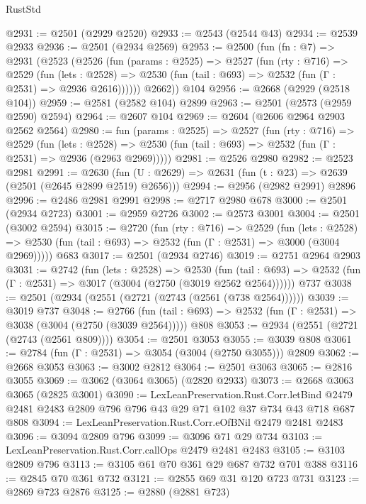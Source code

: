 \begin{lexlean}{RustStd}
\begin{coremodule}
@2931 := @2501 (@2929 @2520)
@2933 := @2543 (@2544 @43)
@2934 := @2539 @2933
@2936 := @2501 (@2934 @2569)
@2953 := @2500
    (fun (fn : @7) =>
    @2931
      (@2523
        (@2526
          (fun (params : @2525) =>
          @2527
            (fun (rty : @716) =>
            @2529
              (fun (lets : @2528) =>
              @2530 (fun (tail : @693) => @2532 (fun (Γ : @2531) => @2936 @2616))))))
        @2662))
    @104
@2956 := @2668 (@2929 (@2518 @104))
@2959 := @2581 (@2582 @104) @2899
@2963 := @2501 (@2573 (@2959 @2590) @2594)
@2964 := @2607 @104
@2969 := @2604 (@2606 @2964 @2903 @2562 @2564)
@2980 := fun (params : @2525) =>
  @2527
    (fun (rty : @716) =>
    @2529
      (fun (lets : @2528) =>
      @2530 (fun (tail : @693) => @2532 (fun (Γ : @2531) => @2936 (@2963 @2969)))))
@2981 := @2526 @2980
@2982 := @2523 @2981
@2991 := @2630 (fun (U : @2629) => @2631 (fun (t : @23) => @2639 (@2501 (@2645 @2899 @2519) @2656)))
@2994 := @2956 (@2982 @2991) @2896
@2996 := @2486 @2981 @2991
@2998 := @2717 @2980 @678
@3000 := @2501 (@2934 @2723)
@3001 := @2959 @2726
@3002 := @2573 @3001
@3004 := @2501 (@3002 @2594)
@3015 := @2720
    (fun (rty : @716) =>
    @2529
      (fun (lets : @2528) =>
      @2530 (fun (tail : @693) => @2532 (fun (Γ : @2531) => @3000 (@3004 @2969)))))
    @683
@3017 := @2501 (@2934 @2746)
@3019 := @2751 @2964 @2903
@3031 := @2742
    (fun (lets : @2528) =>
    @2530
      (fun (tail : @693) => @2532 (fun (Γ : @2531) => @3017 (@3004 (@2750 (@3019 @2562 @2564))))))
    @737
@3038 := @2501 (@2934 (@2551 (@2721 (@2743 (@2561 (@738 @2564))))))
@3039 := @3019 @737
@3048 := @2766
    (fun (tail : @693) => @2532 (fun (Γ : @2531) => @3038 (@3004 (@2750 (@3039 @2564)))))
    @808
@3053 := @2934 (@2551 (@2721 (@2743 (@2561 @809))))
@3054 := @2501 @3053
@3055 := @3039 @808
@3061 := @2784 (fun (Γ : @2531) => @3054 (@3004 (@2750 @3055))) @2809
@3062 := @2668 @3053
@3063 := @3002 @2812
@3064 := @2501 @3063
@3065 := @2816 @3055
@3069 := @3062 (@3064 @3065) (@2820 @2933)
@3073 := @2668 @3063 @3065 (@2825 @3001)
@3090 := LexLeanPreservation.Rust.Corr.letBind
    @2479
    @2481
    @2483
    @2809
    @796
    @796
    @43
    @29
    @71
    @102
    @37
    @734
    @43
    @718
    @687
    @808
@3094 := LexLeanPreservation.Rust.Corr.eOfBNil @2479 @2481 @2483
@3096 := @3094 @2809 @796
@3099 := @3096 @71 @29 @734
@3103 := LexLeanPreservation.Rust.Corr.callOps @2479 @2481 @2483
@3105 := @3103 @2809 @796
@3113 := @3105 @61 @70 @361 @29 @687 @732 @701 @388
@3116 := @2845 @70 @361 @732
@3121 := @2855 @69 @31 @120 @723 @731
@3123 := @2869 @723 @2876
@3125 := @2880 (@2881 @723)

\end{coremodule}
\end{lexlean}
